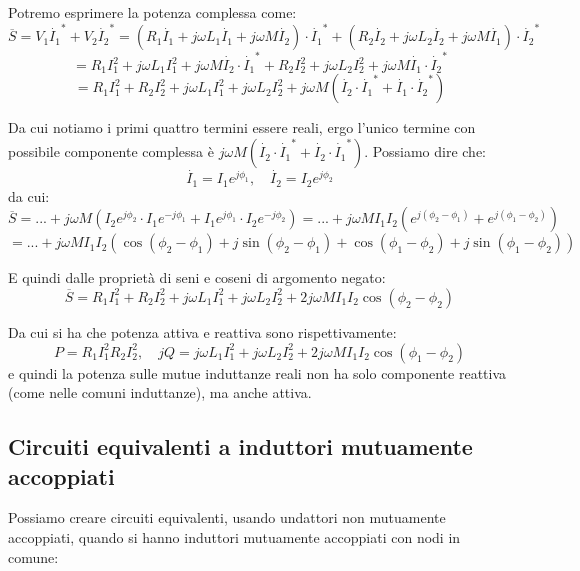 \documentclass[a4paper,11pt]{article}
\begin{document}
Potremo esprimere la potenza complessa come:
$$
\overline{S} = V_1 \dot{I_1}^* + V_2 \dot{I_2}^* = \left( R_1 \dot{I_1} + j \omega L_1 \dot{I_1} + j \omega M \dot{I_2} \right) \cdot \dot{I_1}^* + \left( R_2 \dot{I_2} + j \omega L_2 \dot{I_2} + j \omega M \dot{I_1} \right) \cdot \dot{I_2}^*
$$
$$
= R_1 I_1^2 + j \omega L_1 I_1^2 + j \omega M \dot{I_2} \cdot \dot{I_1}^* + R_2 I_2^2 + j \omega L_2 I_2^2 + j \omega M \dot{I_1} \cdot \dot{I_2}^*
$$
$$
= R_1 I_1^2 + R_2 I_2^2 + j \omega L_1 I_1^2 + j \omega L_2 I_2^2 + j \omega M ( \dot{I_2} \cdot \dot{I_1}^* + \dot{I_1} \cdot \dot{I_2}^* )
$$

Da cui notiamo i primi quattro termini essere reali, ergo l'unico termine con possibile componente complessa è $j \omega M ( \dot{I_2} \cdot \dot{I_1}^* + \dot{I_2} \cdot \dot{I_1}^* )$.
Possiamo dire che:
$$
\dot{I_1} = I_1 e^{j \phi_1}, \quad \dot{I_2} = I_2 e^{j \phi_2}
$$
da cui:
$$
\overline{S} = ... + j \omega M \left( I_2 e^{j \phi_2} \cdot I_1 e^{-j \phi_1} + I_1 e^{j \phi_1} \cdot I_2 e^{-j \phi_2} \right) = ... + j \omega M I_1 I_2 \left( e^{j(\phi_2 - \phi_1)} + e^{j(\phi_1 - \phi_2)} \right)
$$
$$
= ... + j \omega M I_1 I_2 \left( \cos(\phi_2 - \phi_1) + j \sin (\phi_2 - \phi_1) + \cos(\phi_1 - \phi_2) + j \sin(\phi_1 - \phi_2) \right)
$$

E quindi dalle proprietà di seni e coseni di argomento negato:
$$
\overline{S} = R_1 I_1^2 + R_2 I_2 ^2 + j \omega L_1 I_1^2 + j \omega L_2 I_2^2 + 2 j \omega M I_1 I_2 \cos(\phi_2 - \phi_2)
$$

Da cui si ha che potenza attiva e reattiva sono rispettivamente:
$$
P = R_1 I_1^2 R_2 I_2^2, \quad jQ = j \omega L_1 I_1^2 + j \omega L_2 I_2^2 + 2 j \omega M I_1 I_2 \cos(\phi_1 - \phi_2)
$$
e quindi la potenza sulle mutue induttanze reali non ha solo componente reattiva (come nelle comuni induttanze), ma anche attiva. 

\subsection{Circuiti equivalenti a induttori mutuamente accoppiati}
Possiamo creare circuiti equivalenti, usando undattori non mutuamente accoppiati, quando si hanno induttori mutuamente accoppiati con nodi in comune:
\end{document}
